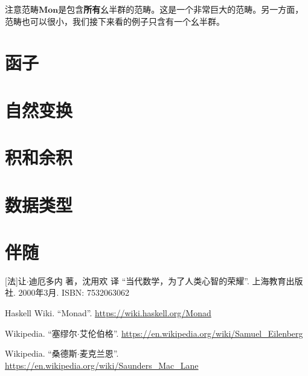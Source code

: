 \documentclass{article}
\begin{document}
注意范畴$\pmb{Mon}$是包含\textbf{所有}幺半群的范畴。这是一个非常巨大的范畴。另一方面，范畴也可以很小，我们接下来看的例子只含有一个幺半群。



\section{函子}

\section{自然变换}

\section{积和余积}

\section{数据类型}

\section{伴随}

\ifx\wholebook\relax \else
\begin{thebibliography}{99}

[法]让$\cdot$迪厄多内 著，沈用欢 译 ``当代数学，为了人类心智的荣耀''. 上海教育出版社. 2000年3月. ISBN: 7532063062

Haskell Wiki. ``Monad''. \url{https://wiki.haskell.org/Monad}

Wikipedia. ``塞缪尔$\cdot$艾伦伯格''. \url{https://en.wikipedia.org/wiki/Samuel_Eilenberg}

Wikipedia. ``桑德斯$\cdot$麦克兰恩''. \url{https://en.wikipedia.org/wiki/Saunders_Mac_Lane}

\end{thebibliography}

\expandafter\enddocument

\fi
\end{document}
